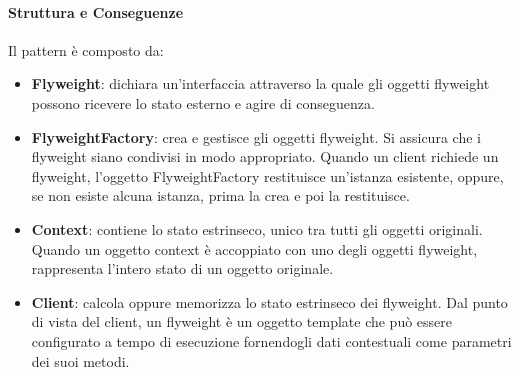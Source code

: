 \paragraph{Struttura e Conseguenze} Il pattern è composto da:
\begin{itemize}
    \item \textbf{Flyweight}: dichiara un’interfaccia attraverso la quale gli oggetti flyweight possono ricevere lo stato esterno e agire di conseguenza.
    \item \textbf{FlyweightFactory}: crea e gestisce gli oggetti flyweight. Si assicura che i flyweight siano condivisi in modo appropriato. Quando un client richiede un flyweight, l’oggetto FlyweightFactory restituisce un’istanza esistente, oppure, se non esiste alcuna istanza, prima la crea e poi la restituisce.
    \item \textbf{Context}: contiene lo stato estrinseco, unico tra tutti gli oggetti originali. Quando un oggetto context è accoppiato con uno degli oggetti flyweight, rappresenta l’intero stato di un oggetto originale.
    \item \textbf{Client}: calcola oppure memorizza lo stato estrinseco dei flyweight. Dal punto di vista del client, un flyweight è un oggetto template che può essere configurato a tempo di esecuzione fornendogli dati contestuali come parametri dei suoi metodi.
\end{itemize}

\newpage